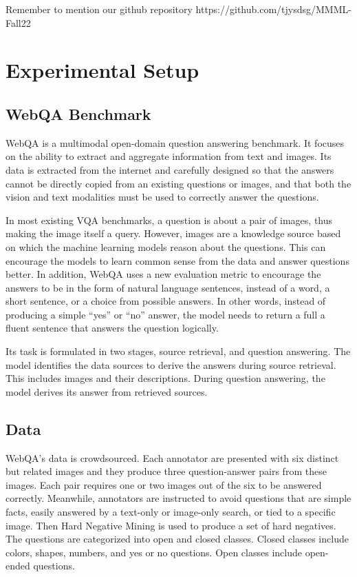 \documentclass[nohyperref]{article}
\theoremstyle{plain}
\theoremstyle{definition}
\theoremstyle{remark}
\begin{document}
    Remember to mention our github repository https://github.com/tjysdsg/MMML-Fall22


    \section{Experimental Setup}

    \subsection{WebQA Benchmark}

    WebQA \cite{webqa} is a multimodal open-domain question answering benchmark.
    It focuses on the ability to extract and aggregate information from text and images.
    Its data is extracted from the internet and carefully designed so that the answers cannot be directly copied from
    an existing questions or images, and that both the vision and text modalities must be used to correctly
    answer the questions.

    In most existing VQA benchmarks, a question is about a pair of images, thus making the image itself a query.
    However, images are a knowledge source based on which the machine learning models reason about the questions.
    This can encourage the models to learn common sense from the data and answer questions better.
    In addition, WebQA uses a new evaluation metric to encourage the answers to be in the form of natural language
    sentences, instead of a word, a short sentence, or a choice from possible answers.
    In other words, instead of producing a simple ``yes'' or ``no'' answer, the model needs to return a full
    a fluent sentence that answers the question logically.

    Its task is formulated in two stages, source retrieval, and question answering.
    The model identifies the data sources to derive the answers during source retrieval.
    This includes images and their descriptions.
    During question answering, the model derives its answer from retrieved sources.

    \subsection{Data}

    WebQA's data is crowdsourced.
    Each annotator are presented with six distinct but related images and they produce three question-answer pairs from these
    images.
    Each pair requires one or two images out of the six to be answered correctly.
    Meanwhile, annotators are instructed to avoid questions that are simple facts, easily answered by a text-only or
    image-only search, or tied to a specific image.
    Then Hard Negative Mining is used to produce a set of hard negatives.
    The questions are categorized into open and closed classes.
    Closed classes include colors, shapes, numbers, and yes or no questions.
    Open classes include open-ended questions.
\end{document}
